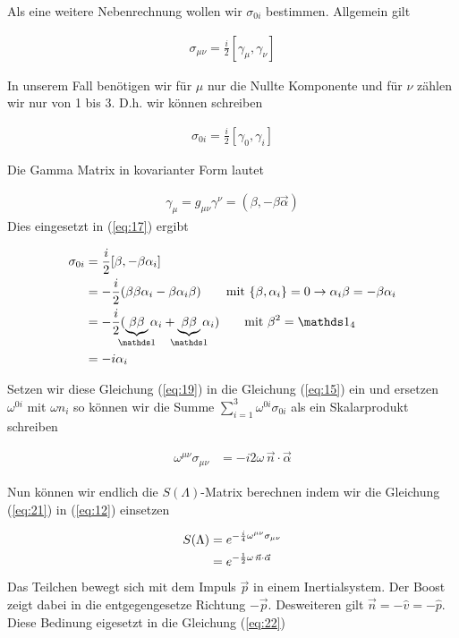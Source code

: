 Als eine weitere Nebenrechnung wollen wir \(\sigma_{0i}\) bestimmen. Allgemein gilt

\begin{align}
  \label{eq:16}
  \sigma_{\mu\nu}=\frac{i}{2}[\gamma_\mu,\gamma_\nu] 
\end{align}

In unserem Fall benötigen wir für \(\mu\) nur die Nullte Komponente und für \(\nu\) zählen wir nur von 1 bis 3. D.h. wir können schreiben

\begin{align}
  \label{eq:17}
  \sigma_{0i}= \frac{i}{2}[\gamma_0,\gamma_i]
\end{align}

Die Gamma Matrix in kovarianter Form lautet

\begin{align}
  \label{eq:18}
  \gamma_\mu = g_{\mu\nu}\gamma^{\nu} = (\beta,-\beta\vec \alpha)
\end{align}
Dies eingesetzt in (\ref{eq:17}) ergibt

\begin{align}
  \label{eq:19}
   \sigma_{0i} &= \frac{i}{2}[\beta,-\beta\alpha_i] \notag\\
&= -\frac{i}{2} ( \beta\beta\alpha_i -\beta\alpha_i\beta  ) \qquad \text{mit }\{\beta,\alpha_i\}=0\rightarrow \alpha_i\beta=-\beta\alpha_i  \notag\\
&= -\frac{i}{2} ( \underbr{\beta\beta}_{\mathds 1}\alpha_i + \underbr{\beta\beta}_{\mathds 1}\alpha_i) \qquad \text{mit }\beta^2 = \mathds 1_4 \notag\\
&= - i \alpha_i
\end{align}

Setzen wir diese Gleichung (\ref{eq:19}) in die Gleichung (\ref{eq:15}) ein und ersetzen \(\omega^{0i}\) mit \(\omega n_i\) so können wir die Summe \(\sum_{i=1}^3 \omega^{0i}\sigma_{0i}\) als ein Skalarprodukt schreiben

\begin{align}
  \label{eq:21}
  \omega^{\mu\nu}\sigma_{\mu\nu} &= -i2\omega\,\vec n\cdot\vec \alpha
\end{align}

Nun können wir endlich die \(S(\Lambda)\)-Matrix berechnen indem wir die Gleichung (\ref{eq:21}) in (\ref{eq:12}) einsetzen

\begin{align}
  \label{eq:22}
  S(\Lambda) &= e^{-\frac{i}{4}\omega^{\mu\nu}\sigma_{\mu\nu}} \notag \\
&=e^{-\frac{1}{2}\omega\,\vec n\cdot\vec \alpha  }
\end{align}
Das Teilchen bewegt sich mit dem Impuls \(\vec p\) in einem Inertialsystem. Der Boost zeigt dabei in die entgegengesetze Richtung \(-\vec p\). Desweiteren gilt \(\vec n = - \hat v = - \hat p \). Diese Bedinung eigesetzt in die Gleichung (\ref{eq:22})

